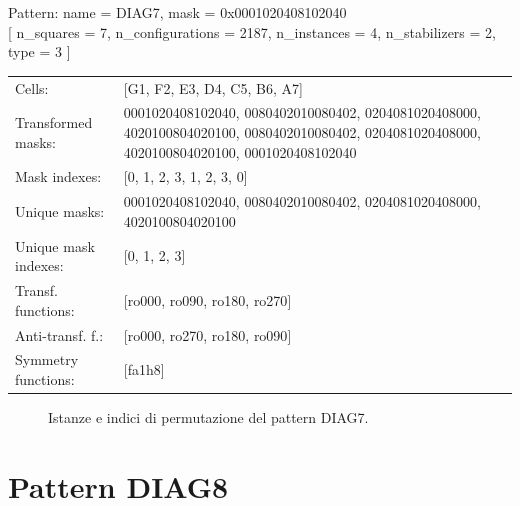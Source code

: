 \begin{tcolorbox}[sharp corners, fontupper=\ttfamily\small, colback=white]
  \noindent Pattern: name = DIAG7, mask = 0x0001020408102040\\
  {[} n\_squares = 7, n\_configurations = 2187,
  n\_instances = 4, n\_stabilizers = 2, type = 3 { ]}\\[1.0ex]
  \begin{tabularx}{\textwidth}{@{} p{3.5cm} X @{}}
    Cells:               & {[}G1, F2, E3, D4, C5, B6, A7{]}\\[0.5ex]
    Transformed masks:   & 0001020408102040, 0080402010080402, 0204081020408000, 4020100804020100, 0080402010080402, 0204081020408000, 4020100804020100, 0001020408102040\\[0.5ex]
    Mask indexes:        & {[}0, 1, 2, 3, 1, 2, 3, 0{]}\\[0.5ex]
    Unique masks:        & 0001020408102040, 0080402010080402, 0204081020408000, 4020100804020100\\[0.5ex]
    Unique mask indexes: & {[}0, 1, 2, 3{]}\\[0.5ex]
    Transf. functions:   & {[}ro000, ro090, ro180, ro270{]}\\[0.5ex]
    Anti-transf. f.:     & {[}ro000, ro270, ro180, ro090{]}\\[0.5ex]
    Symmetry functions:  & {[}fa1h8{]}\\[0.5ex]
  \end{tabularx}
\end{tcolorbox}

\begin{figure}[htbp]
  \centering
   \hfill
   \hfill
   \hfill
  \vspace{0.3cm}
   \hfill
   \hfill
   \hfill
  \caption{Istanze e indici di permutazione del pattern DIAG7.}
\end{figure}

\newpage

\section{Pattern DIAG8}

